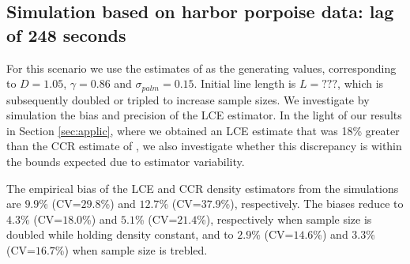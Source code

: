 \documentclass[useAMS, usenatbib, referee]{biom}\usepackage[]{graphicx}\usepackage[]{color}
\begin{document}

\subsection{Simulation based on harbor porpoise data: lag of 248 seconds}


For this scenario we use the estimates of \cite{Stevenson+al:18} as the generating values, corresponding to $D=1.05$, $\gamma=0.86$ and $\sigma_{palm}=0.15$. Initial line length is $L=???$, which is subsequently doubled or tripled to increase sample sizes. We investigate by simulation the bias and precision of the LCE estimator. In the light of our results in Section \ref{sec:applic}, where we obtained an LCE estimate that was 18\% greater than the CCR estimate of \cite{Stevenson+al:18}, we also investigate whether this discrepancy is within the bounds expected due to estimator variability.





The empirical bias of the LCE and CCR density estimators from the simulations are $9.9$\% (CV=$29.8$\%) and $12.7$\% (CV=$37.9$\%), respectively. The biases reduce to $4.3$\% (CV=$18.0$\%) and $5.1$\% (CV=$21.4$\%), respectively when sample size is doubled while holding density constant, and to $2.9$\% (CV=$14.6$\%) and $3.3$\% (CV=$16.7$\%) when sample size is trebled.

\end{document}
